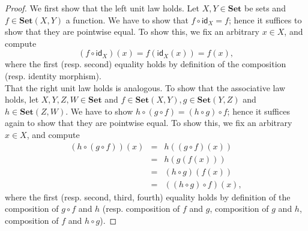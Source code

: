 \documentclass[a4paper,11pt, oneside,titlepage=false]{scrbook}
\theoremstyle{plain}
\theoremstyle{definition}
\newcommand{\cfont}[1]{\ensuremath{\mathsf{#1}}}
\newcommand{\Catb}[1]{\mathbf{#1}}
\newcommand{\SET}{\Catb{Set}}
\newcommand{\CHom}[3]{{#1}(#2,#3)}
\newcommand{\Id}[1][]{\cfont{id}_{#1}}
\newcommand{\co}[2]{\ensuremath{#2 \circ #1}}
\begin{document}
\begin{proof}
  We first show that the left unit law holds. Let $X,Y\in \mathbf{Set}$ be sets and $f\in \CHom \SET X Y$ a function. We have to show that $\co {\Id[X]}{f} = f$; hence it suffices to show that they are pointwise equal.
  To show this, we fix an arbitrary $x \in X$, and compute
\[
   (f\circ \Id[X])(x) = f\left(\Id[X](x)\right) = f(x),
\]
where the first (resp. second) equality holds by definition of the composition (resp. identity morphism).\\
That the right unit law holds is analogous. To show that the associative law holds, let $X,Y,Z,W\in\mathbf{Set}$ and $f\in \CHom \SET X Y, g\in \CHom \SET Y Z$ and $h\in \CHom \SET Z W$. We have to show $h\circ (g\circ f) = (h\circ g)\circ f$; hence it suffices again to show that they are pointwise equal.
To show this, we fix an arbitrary $x \in X$, and compute
\begin{eqnarray*}
  \left(h\circ (g\circ f)\right)(x) &=& h\left((g\circ f)(x)\right)
  \\
                                    &=& h(g(f(x)))
  \\
                                    &=& (h\circ g)(f(x))
  \\
                                    &=& \left((h\circ g)\circ f\right)(x),
\end{eqnarray*}
where the first (resp. second, third, fourth) equality holds by definition of the composition of $g\circ f$ and $h$ (resp. composition of $f$ and $g$, composition of $g$ and $h$, composition of $f$ and $h\circ g$).
\end{proof}
\end{document}
